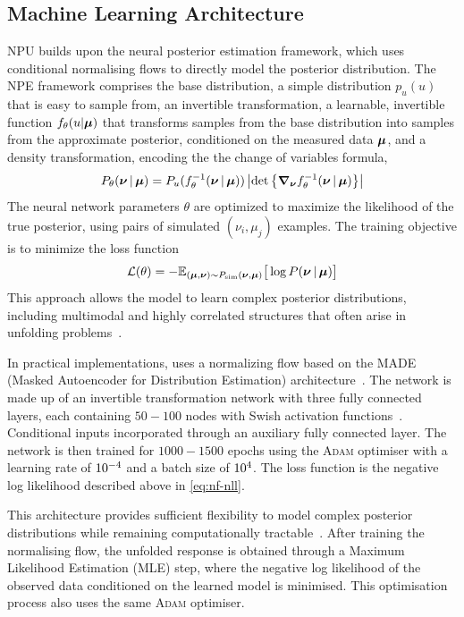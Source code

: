 \subsection{Machine Learning Architecture}
    NPU builds upon the neural posterior estimation framework, which uses conditional normalising flows to directly model the posterior distribution.
    The NPE framework comprises the base distribution, a simple distribution $p_u(u)$ that is easy to sample from,
    an invertible transformation, a learnable, invertible function $f_\theta(u|\vb*\mu)$ that transforms samples from the base distribution into samples from the approximate posterior, conditioned on the measured data $\vb*\mu$, and
    a density transformation, encoding the the change of variables formula,
    \[
        P_\theta(\vb*\nu\,|\,\vb*\mu) = P_u(f_\theta^{-1}(\vb*\nu\,|\,\vb*\mu)) \left|\det\qty{ \grad_{\vb*\nu}f_\theta^{-1}(\vb*\nu\,|\,\vb*\mu)}\right|
    \]
    The neural network parameters $\theta$ are optimized to maximize the likelihood of the true posterior, using pairs of simulated $(\nu_i, \mu_j)$ examples.
    The training objective is to minimize the loss function
    \[
        \label{eq:nf-nll}
        \mathcal{L}(\theta) = -\mathbb{E}_{(\vb*\mu,\vb*\nu) \sim P_{\text{sim}}(\vb*\nu, \vb*\mu)} \big[ \log P (\vb*\nu\,|\,\vb*\mu)\big]
    \]
    This approach allows the model to learn complex posterior distributions, including multimodal and highly correlated structures that often arise in unfolding problems~\cite{Papamakarios2016FastEstimation}.

    In practical implementations, uses a normalizing flow based on the MADE (Masked Autoencoder for Distribution Estimation) architecture~\cite{papamakarios_masked_2018}.
    The network is made up of an invertible transformation network with three fully connected layers, each containing \(50-100\) nodes with Swish activation functions~\cite{Ramachandran2017SearchingFunctions}.
    Conditional inputs incorporated through an auxiliary fully connected layer.
    The network is then trained for \(1000-1500\) epochs using the \textsc{Adam} optimiser with a learning rate of \(\num{d-4}\) and a batch size of \(\num{d4}\).
    The loss function is the negative log likelihood described above in \cref{eq:nf-nll}.
    
    This architecture provides sufficient flexibility to model complex posterior distributions while remaining computationally tractable~\cite{Rezende2015VariationalFlows, Kobyzev2019NormalizingMethods}.
    After training the normalising flow, the unfolded response is obtained through a Maximum Likelihood Estimation (MLE) step, where the negative log likelihood of the observed data conditioned on the learned model is minimised.
    This optimisation process also uses the same \textsc{Adam} optimiser.
